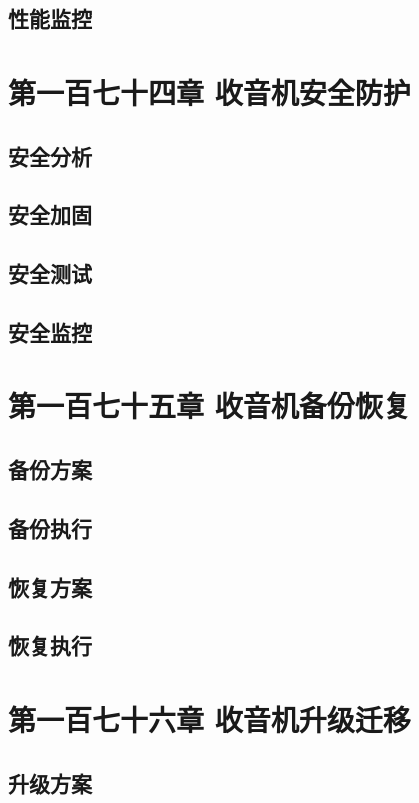 \documentclass[12pt,UTF8]{ctexbook}
\begin{document}
\section{性能监控}

\chapter{第一百七十四章 收音机安全防护}

\section{安全分析}
\section{安全加固}
\section{安全测试}
\section{安全监控}

\chapter{第一百七十五章 收音机备份恢复}

\section{备份方案}
\section{备份执行}
\section{恢复方案}
\section{恢复执行}

\chapter{第一百七十六章 收音机升级迁移}

\section{升级方案}
\end{document}
